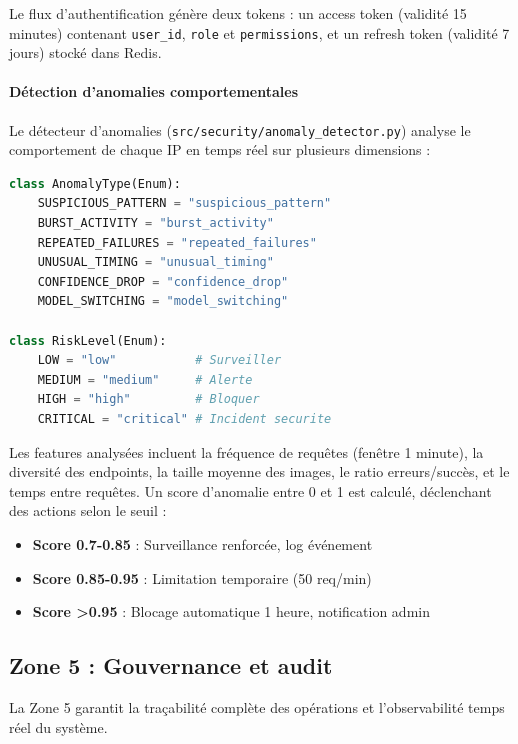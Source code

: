 Le flux d'authentification génère deux tokens : un access token (validité 15 minutes) contenant \texttt{user\_id}, \texttt{role} et \texttt{permissions}, et un refresh token (validité 7 jours) stocké dans Redis.

\paragraph{Détection d'anomalies comportementales}

Le détecteur d'anomalies (\texttt{src/security/anomaly\_detector.py}) analyse le comportement de chaque IP en temps réel sur plusieurs dimensions :

\begin{lstlisting}[language=Python, caption=Types d'anomalies et niveaux de risque]
class AnomalyType(Enum):
    SUSPICIOUS_PATTERN = "suspicious_pattern"
    BURST_ACTIVITY = "burst_activity"
    REPEATED_FAILURES = "repeated_failures"
    UNUSUAL_TIMING = "unusual_timing"
    CONFIDENCE_DROP = "confidence_drop"
    MODEL_SWITCHING = "model_switching"

class RiskLevel(Enum):
    LOW = "low"           # Surveiller
    MEDIUM = "medium"     # Alerte
    HIGH = "high"         # Bloquer
    CRITICAL = "critical" # Incident securite
\end{lstlisting}

Les features analysées incluent la fréquence de requêtes (fenêtre 1 minute), la diversité des endpoints, la taille moyenne des images, le ratio erreurs/succès, et le temps entre requêtes. Un score d'anomalie entre 0 et 1 est calculé, déclenchant des actions selon le seuil :

\begin{itemize}
    \item \textbf{Score 0.7-0.85} : Surveillance renforcée, log événement
    \item \textbf{Score 0.85-0.95} : Limitation temporaire (50 req/min)
    \item \textbf{Score >0.95} : Blocage automatique 1 heure, notification admin
\end{itemize}


\subsection{Zone 5 : Gouvernance et audit}

La Zone 5 garantit la traçabilité complète des opérations et l'observabilité temps réel du système.

